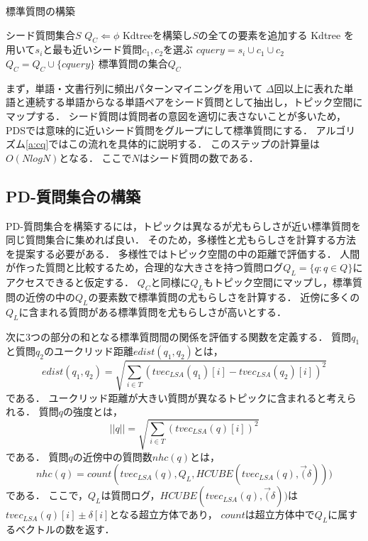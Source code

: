 \documentclass[master]{suribt}
\theoremstyle{definition}
\begin{document}
 \begin{algorithm}
 \caption{標準質問の構築}
 \begin{algorithmic}[1]
  \Require シード質問集合$S$
  \State $Q_C \Leftarrow \phi$
  \State Kdtreeを構築し$S$の全ての要素を追加する
  \State Kdtree を用いて$s_i$と最も近いシード質問$c_1,c_2$を選ぶ
  \State $cquery = s_i \cup c_1 \cup c_2$
  \State $Q_C = Q_C \cup \{cquery\}$
  \EndIf
  \EndFor
  \Ensure 標準質問の集合$Q_C$
 \end{algorithmic}
 \label{a:cq}
 \end{algorithm}

 まず，単語・文書行列に頻出パターンマイニング\cite{apriori2010}を用いて
 $\Delta$回以上に表れた単語と連続する単語からなる単語ペアをシード質問として抽出し，トピック空間にマップする．
 シード質問は質問者の意図を適切に表さないことが多いため，
 PDSでは意味的に近いシード質問をグループにして標準質問にする．
 アルゴリズム\ref{a:cq}ではこの流れを具体的に説明する．
 このステップの計算量は$O(NlogN)$となる．
 ここで$N$はシード質問の数である．

 \subsection{PD-質問集合の構築}
 PD-質問集合を構築するには，トピックは異なるが尤もらしさが近い標準質問を同じ質問集合に集めれば良い．
 そのため，多様性と尤もらしさを計算する方法を提案する必要がある．
 多様性ではトピック空間の中の距離で評価する．
 人間が作った質問と比較するため，合理的な大きさを持つ質問ログ$Q_L = \{q: q \in Q\}$にアクセスできると仮定する．
 $Q_C$と同様に$Q_L$もトピック空間にマップし，標準質問の近傍の中の$Q_L$の要素数で標準質問の尤もらしさを計算する．
 近傍に多くの$Q_L$に含まれる質問がある標準質問を尤もらしさが高いとする．

 次に3つの部分の和となる標準質問間の関係を評価する関数を定義する．
 質問$q_1$と質問$q_2$のユークリッド距離$edist(q_1,q_2)$とは，
 \begin{equation}
 edist(q_1,q_2) = \sqrt{\sum_{i \in T}(tvec_{LSA}(q_1)[i] - tvec_{LSA}(q_2)[i])^2}
 \end{equation}
 である．
 ユークリッド距離が大きい質問が異なるトピックに含まれると考えられる．
 質問$q$の強度とは，
 \begin{equation}
 ||q|| = \sqrt{\sum_{i \in T}(tvec_{LSA}(q)[i])^2}
 \end{equation}
 である．
 質問$q$の近傍中の質問数$nhc(q)$とは，
 \begin{equation}
 nhc(q) = count(tvec_{LSA}(q),Q_L,HCUBE(tvec_{LSA}(q),\vec(\delta)))
 \end{equation}
 である．
 ここで，$Q_L$は質問ログ，$HCUBE(tvec_{LSA}(q),\vec(\delta))$は$tvec_{LSA}(q)[i] \pm \delta[i]$となる超立方体であり，
 $count$は超立方体中で$Q_L$に属するベクトルの数を返す．
 
\end{document}
